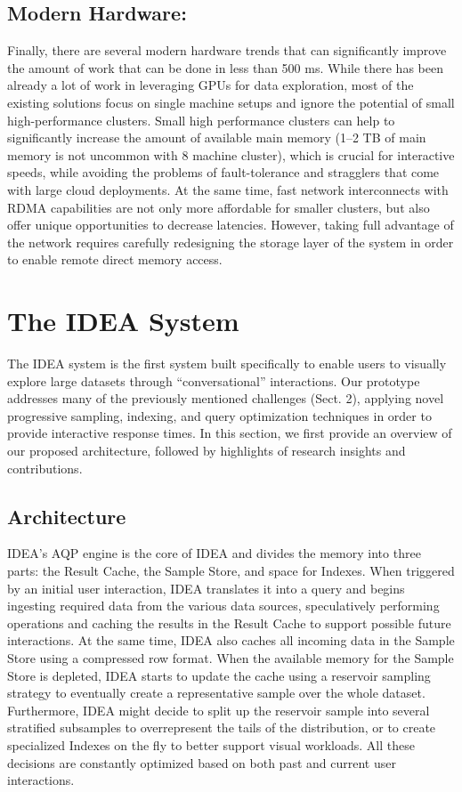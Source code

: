\documentclass[12pt,letterpaper, onecolumn]{exam}
\begin{document}
    \subsection{Modern Hardware:} Finally, there are several modern hardware trends that can significantly improve the amount of work that can be done in less than 500 ms. While there has been already a lot of work in leveraging GPUs for data exploration, most of the existing solutions focus on single machine setups and ignore the potential of small high-performance clusters. Small high performance clusters can help to significantly increase the amount of available main memory (1–2 TB of main memory is not uncommon with 8 machine cluster), which is crucial for interactive speeds, while avoiding the problems of fault-tolerance and stragglers that come with large cloud deployments. At the same time, fast network interconnects with RDMA capabilities are not only more affordable for smaller clusters, but also offer unique opportunities to decrease latencies. However, taking full advantage of the network requires carefully redesigning the storage layer of the system in order to enable remote direct memory access.
    
    \section{The IDEA System}
    
    The IDEA system is the first system built specifically to enable users to visually explore large datasets through “conversational” interactions. Our prototype addresses many of the previously mentioned challenges (Sect. 2), applying novel progressive sampling, indexing, and query optimization techniques in order to provide interactive response times. In this section, we first provide an overview of our proposed architecture, followed by highlights of research insights and contributions.
    
    \subsection{Architecture}
    
    IDEA’s AQP engine is the core of IDEA and divides the memory into three parts: the Result Cache, the Sample Store, and space for Indexes. When triggered by an initial user interaction, IDEA translates it into a query and begins ingesting required data from the various data sources, speculatively performing operations and caching the results in the Result Cache to support possible future interactions. At the same time, IDEA also caches all incoming data in the Sample Store using a compressed row format. When the available memory for the Sample Store is depleted, IDEA starts to update the cache using a reservoir sampling strategy to eventually create a representative sample over the whole dataset. Furthermore, IDEA might decide to split up the reservoir sample into several stratified subsamples to overrepresent the tails of the distribution, or to create specialized Indexes on the fly to better support visual workloads. All these decisions are constantly optimized based on both past and current user interactions.
    
\end{document}
